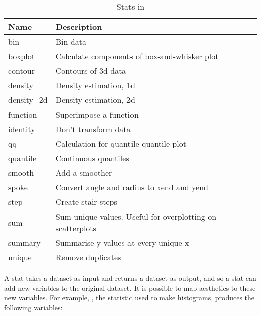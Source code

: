 \begin{table}
  \begin{center}
  \begin{tabular}{lp{3in}}
    \toprule
    Name & Description \\
    \midrule
    bin          & Bin data                                                   \\
    boxplot      & Calculate components of box-and-whisker plot               \\
    contour      & Contours of 3d data                                        \\
    density      & Density estimation, 1d                                     \\
    density\_2d & Density estimation, 2d                                     \\
    function     & Superimpose a function                                     \\
    identity     & Don't transform data                                       \\
    qq           & Calculation for quantile-quantile plot                     \\
    quantile     & Continuous quantiles                                       \\
    smooth       & Add a smoother                                             \\
    spoke        & Convert angle and radius to xend and yend                  \\
    step         & Create stair steps                                         \\
    sum          & Sum unique values.  Useful for overplotting on scatterplots\\
    summary      & Summarise y values at every unique x                       \\
    unique       & Remove duplicates                                          \\
    \bottomrule
  \end{tabular}
  \end{center}
  \caption{Stats in \ggplot}
  \label{tbl:stats}
\end{table}

A stat takes a dataset as input and returns a dataset as output, and so a stat can add new variables to the original dataset.  It is possible to map aesthetics to these new variables.  For example, , the statistic used to make histograms, produces the following variables:

